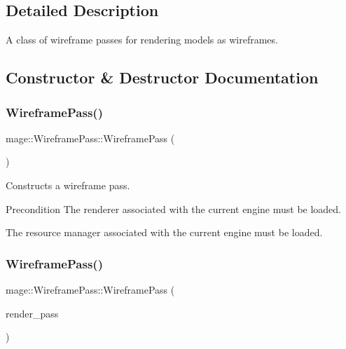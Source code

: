 \subsection{Detailed Description}
A class of wireframe passes for rendering models as wireframes. 

\subsection{Constructor \& Destructor Documentation}
\hypertarget{classmage_1_1_wireframe_pass_a7323b3caca5d06a068a89c0333651f04}{}\label{classmage_1_1_wireframe_pass_a7323b3caca5d06a068a89c0333651f04} 
\subsubsection{\texorpdfstring{Wireframe\+Pass()}{WireframePass()}\hspace{0.1cm}{\footnotesize\ttfamily [1/3]}}
{\footnotesize\ttfamily mage\+::\+Wireframe\+Pass\+::\+Wireframe\+Pass (\begin{DoxyParamCaption}{ }\end{DoxyParamCaption})}

Constructs a wireframe pass.

\begin{DoxyPrecond}{Precondition}
The renderer associated with the current engine must be loaded. 

The resource manager associated with the current engine must be loaded. 
\end{DoxyPrecond}
\hypertarget{classmage_1_1_wireframe_pass_a3e070108925c2ef3b4feaa29dbf605f2}{}\label{classmage_1_1_wireframe_pass_a3e070108925c2ef3b4feaa29dbf605f2} 
\subsubsection{\texorpdfstring{Wireframe\+Pass()}{WireframePass()}\hspace{0.1cm}{\footnotesize\ttfamily [2/3]}}
{\footnotesize\ttfamily mage\+::\+Wireframe\+Pass\+::\+Wireframe\+Pass (\begin{DoxyParamCaption}\item[{const \hyperlink{classmage_1_1_wireframe_pass}{Wireframe\+Pass} \&}]{render\+\_\+pass }\end{DoxyParamCaption})\hspace{0.3cm}{\ttfamily [delete]}}

